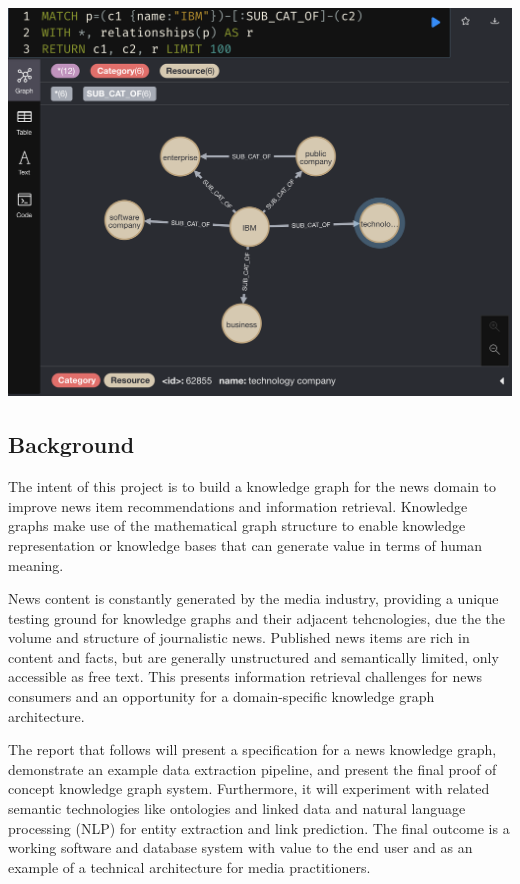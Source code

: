 \documentclass[11pt]{article}
\begin{document}
\begin{enumerate}
{    \centerline{\includegraphics[scale=0.3]{use-case-5b}}
    }
\end{enumerate}
\subsection{Background}
The intent of this project is to build a knowledge graph for the news domain to improve news item recommendations and information retrieval. Knowledge graphs make use of the mathematical graph structure to enable knowledge representation or knowledge bases that can generate value in terms of human meaning.

News content is constantly generated by the media industry, providing a unique testing ground for knowledge graphs and their adjacent tehcnologies, due the the volume and structure of journalistic news. Published news items are rich in content and facts, but are generally unstructured and semantically limited, only accessible as free text. This presents information retrieval challenges for news consumers and an opportunity for a domain-specific knowledge graph architecture.

The report that follows will present a specification for a news knowledge graph, demonstrate an example data extraction pipeline, and present the final proof of concept knowledge graph system. Furthermore, it will experiment with related semantic technologies like ontologies and linked data and natural language processing (NLP) for entity extraction and link prediction. The final outcome is a working software and database system with value to the end user and as an example of a technical architecture for media practitioners.
\end{document}
